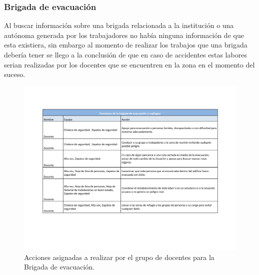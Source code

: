 \subsubsection{Brigada de evacuación}

Al buscar información sobre una brigada relacionada a la institución o una autónoma generada por los trabajadores no había ninguna información de que esta existiera, sin embargo al momento de realizar los trabajos que una brigada debería tener se llego a la conclusión de que en caso de accidentes estas labores serian realizadas por los docentes que se encuentren en la zona en el momento del suceso.
\begin{figure}[H]
    \centering
    \includegraphics[trim = {20mm 40mm 20mm 10mm},clip,scale=0.35]{19/Img/brigadaEvacuacion.pdf}
    \caption{Acciones asignadas a realizar por el grupo de docentes para la Brigada de evacuación.}
    \label{fig:brigadaEvacuacion}
\end{figure}
